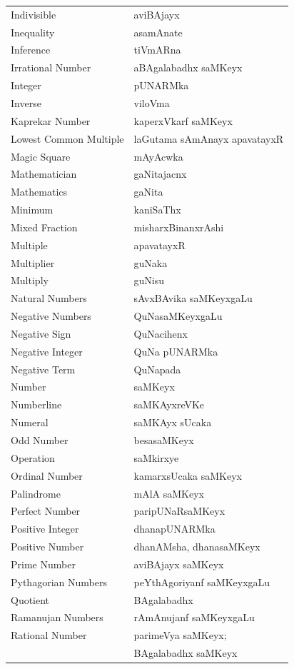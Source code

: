 \begin{longtable}{>{\rm}l@{\hspace{2cm}}l}
Indivisible & aviBAjayx\\
Inequality & asamAnate\\
Inference & tiVmARna\\
Irrational Number & aBAgalabadhx saMKeyx\\
Integer & pUNARMka\\
Inverse & viloVma\\
Kaprekar Number & kaperxVkarf saMKeyx\\
Lowest Common Multiple & laGutama sAmAnayx apavatayxR\\
Magic Square & mAyAcwka\\
Mathematician & gaNitajacnx\\
Mathematics & gaNita\\
Minimum & kaniSaThx\\
Mixed Fraction & misharxBinanxrAshi\\
Multiple & apavatayxR\\
Multiplier & guNaka\\
Multiply & guNisu\\
Natural Numbers & sAvxBAvika saMKeyxgaLu\\
Negative Numbers & QuNasaMKeyxgaLu\\
Negative Sign & QuNacihenx\\
Negative Integer & QuNa pUNARMka\\
Negative Term & QuNapada\\
Number & saMKeyx\\
Numberline & saMKAyxreVKe\\
Numeral & saMKAyx sUcaka\\
Odd Number & besasaMKeyx\\
Operation & saMkirxye\\
Ordinal Number & kamarxsUcaka saMKeyx\\
Palindrome & mAlA saMKeyx\\
Perfect Number & paripUNaRsaMKeyx\\
Positive Integer & dhanapUNARMka\\
Positive Number & dhanAMsha, dhanasaMKeyx\\
Prime Number & aviBAjayx saMKeyx\\
Pythagorian Numbers  & peYthAgoriyanf saMKeyxgaLu\\
Quotient & BAgalabadhx\\
Ramanujan Numbers & rAmAnujanf saMKeyxgaLu\\
Rational Number & parimeVya saMKeyx;\\ 
                & BAgalabadhx saMKeyx\\

\end{longtable}
